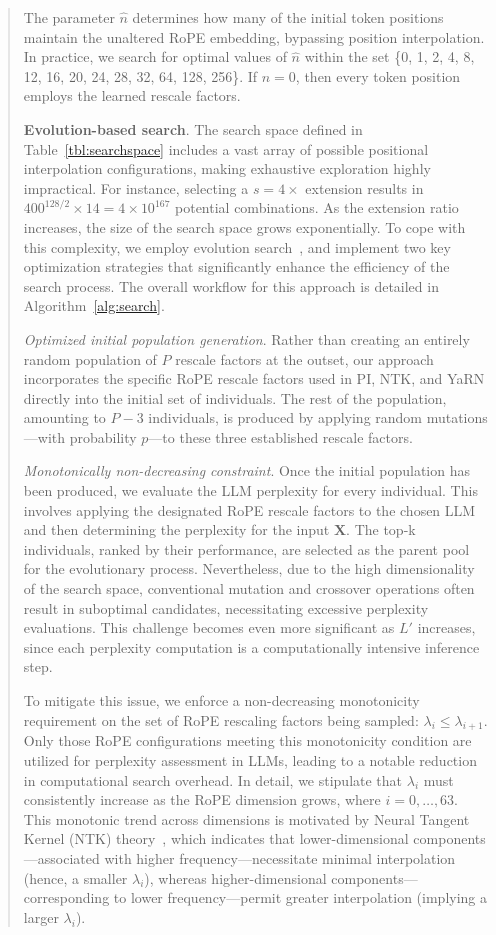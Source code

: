 \begin{abstract}
The parameter $\hat{n}$ determines how many of the initial token positions maintain the unaltered RoPE embedding, bypassing position interpolation. In practice, we search for optimal values of $\hat{n}$ within the set \{0, 1, 2, 4, 8, 12, 16, 20, 24, 28, 32, 64, 128, 256\}. If $\hat{n}=0$, then every token position employs the learned rescale factors.

\textbf{Evolution-based search}. The search space defined in Table~\ref{tbl:searchspace} includes a vast array of possible positional interpolation configurations, making exhaustive exploration highly impractical. For instance, selecting a $s=4\times$ extension results in $400^{128/2}\times14 = 4\times10^{167}$ potential combinations. As the extension ratio increases, the size of the search space grows exponentially. To cope with this complexity, we employ evolution search~\cite{guo2020single}, and implement two key optimization strategies that significantly enhance the efficiency of the search process. The overall workflow for this approach is detailed in Algorithm~\ref{alg:search}.

\textit{Optimized initial population generation}. Rather than creating an entirely random population of $P$ rescale factors at the outset, our approach incorporates the specific RoPE rescale factors used in PI, NTK, and YaRN directly into the initial set of individuals. The rest of the population, amounting to $P-3$ individuals, is produced by applying random mutations—with probability $p$—to these three established rescale factors.

\textit{Monotonically non-decreasing constraint}. Once the initial population has been produced, we evaluate the LLM perplexity for every individual. This involves applying the designated RoPE rescale factors to the chosen LLM and then determining the perplexity for the input $\mathbf{X}$. The top-k individuals, ranked by their performance, are selected as the parent pool for the evolutionary process. Nevertheless, due to the high dimensionality of the search space, conventional mutation and crossover operations often result in suboptimal candidates, necessitating excessive perplexity evaluations. This challenge becomes even more significant as $L'$ increases, since each perplexity computation is a computationally intensive inference step.

To mitigate this issue, we enforce a non-decreasing monotonicity requirement on the set of RoPE rescaling factors being sampled: $\lambda_i \leq \lambda_{i+1}$. Only those RoPE configurations meeting this monotonicity condition are utilized for perplexity assessment in LLMs, leading to a notable reduction in computational search overhead. In detail, we stipulate that $\lambda_i$ must consistently increase as the RoPE dimension grows, where $i = 0, \ldots, 63$. This monotonic trend across dimensions is motivated by Neural Tangent Kernel (NTK) theory~\cite{jacot2018neural, tancik2020fourier, ntk}, which indicates that lower-dimensional components—associated with higher frequency—necessitate minimal interpolation (hence, a smaller $\lambda_i$), whereas higher-dimensional components—corresponding to lower frequency—permit greater interpolation (implying a larger $\lambda_i$).


\end{abstract}
